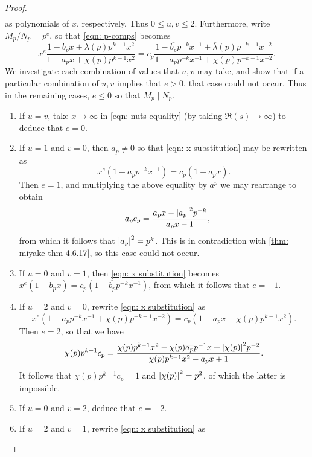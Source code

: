 \documentclass[10pt,leqno,twoside,b5paper]{article}
\theoremstyle{plain}
\theoremstyle{definition}
\numberwithin{equation}{section}
\numberwithin{lem}{section}
\begin{document}
\begin{proof}
\begin{align*}
    \end{align*} as polynomials of $x$, respectively. Thus $0\leq u,v\leq 2$. Furthermore, write $M_p/N_p = p^e$, so that \cref{eqn: p-comps} becomes \begin{equation}\label{eqn: x substitution}
        x^e\frac{1-b_px + \lambda(p)p^{k-1}x^2}{1-a_px + \chi(p)p^{k-1}x^2} = c_p\frac{1-\overline{b_p}p^{-k}x^{-1} + \overline{\lambda}(p)p^{-k-1}x^{-2}}{1-\overline{a_p}p^{-k}x^{-1} + \overline{\chi}(p)p^{-k-1}x^{-2}}.
    \end{equation} We investigate each combination of values that $u,v$ may take, and show that if a particular combination of $u,v$ implies that $e>0$, that case could not occur. Thus in the remaining cases, $e\leq 0$ so that $M_p\mid N_p$.
    \begin{enumerate}[label=(\arabic*)]
        \item If $u = v$, take $x\to \infty$ in \cref{eqn: nuts equality} (by taking $\Re(s)\to\infty$) to deduce that $e= 0$.
        \item If $u = 1$ and $v = 0$, then $a_p\neq 0$ so that \cref{eqn: x substitution} may be rewritten as 
        \[x^e(1-\overline{a_p}p^{-k}x^{-1})=c_p(1-a_px).\] Then $e = 1$, and multiplying the above equality by $a^p$ we may rearrange to obtain 
        \[-a_pc_p = \frac{a_px-\abs{a_p}^2p^{-k}}{a_px-1},\] from which it follows that $\abs{a_p}^2 = p^k$. This is in contradiction with \cref{thm: miyake thm 4.6.17}, so this case could not occur.
        \item If $u = 0$ and $v = 1$, then \cref{eqn: x substitution} becomes $x^e(1-b_px) = c_p(1-\overline{b_p}p^{-k}x^{-1})$, from which it follows that $e = -1$.
        \item If $u = 2$ and $v = 0$, rewrite \cref{eqn: x substitution} as 
        \begin{equation}\label{eqn: nuts equality}
            x^e(1-\overline{a_p}p^{-k}x^{-1} + \overline{\chi}(p)p^{-k-1}x^{-2})=c_p(1-a_px + \chi(p)p^{k-1}x^2).
        \end{equation} Then $e=2$, so that we have 
        \[\chi(p)p^{k-1}c_p = \frac{\chi(p)p^{k-1}x^2-\chi(p)\overline{a_p}p^{-1}x + \abs{\chi(p)}^2p^{-2}}{\chi(p)p^{k-1}x^2-a_px+1}.\] It follows that $\chi(p)p^{k-1}c_p = 1$ and $\abs{\chi(p)}^2 = p^{2}$, of which the latter is impossible.
        \item If $u = 0$ and $v = 2$, deduce that $e = -2$.
        \item If $u = 2$ and $v = 1$, rewrite \cref{eqn: x substitution} as 

\end{enumerate}
\end{proof}
\end{document}
